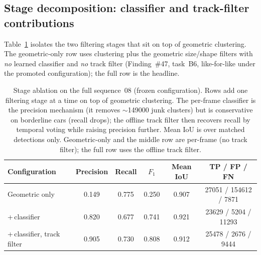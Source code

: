 \subsection{Stage decomposition: classifier and track-filter contributions}
\label{sec:ablation-stage}

Table~\ref{tab:ablation-stage} isolates the two filtering stages that sit on top
of geometric clustering. The geometric-only row uses clustering plus the
geometric size/shape filters with \emph{no} learned classifier and \emph{no}
track filter (Finding~\#47, task~B6, like-for-like under the promoted
configuration); the full row is the headline.

\begin{table}[H]
  \centering
  \caption{Stage ablation on the full sequence~08 (frozen configuration). Rows
    add one filtering stage at a time on top of geometric clustering. The
    per-frame classifier is the precision mechanism (it removes $\sim$\num{149000}
    junk clusters) but is conservative on borderline cars (recall drops); the
    offline track filter then recovers recall by temporal voting while raising
    precision further. Mean IoU is over matched detections only. Geometric-only
    and the middle row are per-frame (no track filter); the full row uses the
    offline track filter.}
  \label{tab:ablation-stage}
  \setlength{\tabcolsep}{5pt}
  \begin{tabular}{lccccc}
    \toprule
    Configuration & Precision & Recall & $F_1$ & Mean IoU & TP / FP / FN \\
    \midrule
    Geometric only                & 0.149 & 0.775 & 0.250 & 0.907 & \num{27051} / \num{154612} / \num{7871} \\
    \;+\,classifier              & 0.820 & 0.677 & 0.741 & 0.921 & \num{23629} / \num{5204} / \num{11293} \\
    \;+\,classifier, track filter & 0.905 & 0.730 & 0.808 & 0.912 & \num{25478} / \num{2676} / \num{9444} \\
    \bottomrule
  \end{tabular}
\end{table}

